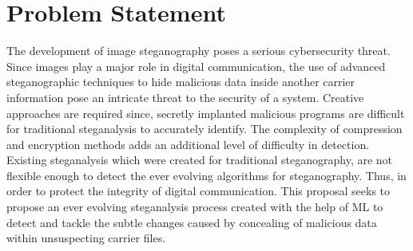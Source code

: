 \section{Problem Statement}
The development of image steganography poses a serious cybersecurity threat. Since images play a major role in digital communication, the use of advanced steganographic techniques to hide malicious data inside another carrier information pose an intricate threat to the security of a system. Creative approaches are required since, secretly implanted malicious programs are difficult for traditional steganalysis to accurately identify. The complexity of compression and encryption methods adds an additional level of difficulty in detection. Existing steganalysis which were created for traditional steganography, are not flexible enough to detect the ever evolving algorithms for steganography. Thus, in order to protect the integrity of digital communication. This proposal seeks to propose an ever evolving steganalysis process created with the help of ML to detect and tackle the subtle changes caused by concealing of malicious data within unsuspecting carrier files.\\
